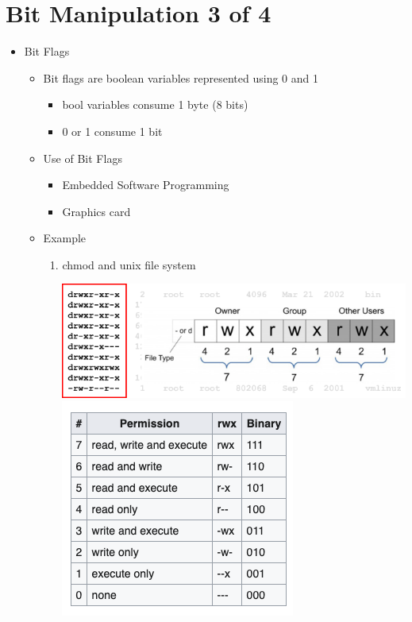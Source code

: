 \documentclass[12pt]{article}
\begin{document}
\bigskip

\section*{Bit Manipulation 3 of 4}

\bigskip

\begin{itemize}
    \item Bit Flags
    \begin{itemize}
        \item Bit flags are boolean variables represented using 0 and 1
        \begin{itemize}
            \item bool variables consume 1 byte (8 bits)
            \item 0 or 1 consume 1 bit
        \end{itemize}
        \item Use of Bit Flags
        \begin{itemize}
            \item Embedded Software Programming
            \item Graphics card
        \end{itemize}
        \item Example
        \begin{enumerate}[1.]
            \item chmod and unix file system

            \begin{center}
            \includegraphics[width=\linewidth]{images/week_9_notes_3_1.png}
            \includegraphics[width=0.4\linewidth]{images/week_9_notes_3_2.png}
            \end{center}


\end{enumerate}
\end{itemize}
\end{itemize}
\end{document}
